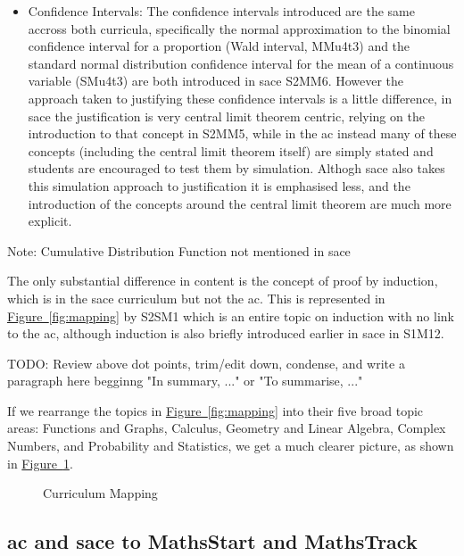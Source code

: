\documentclass[twoside,12pt,a4paper]{report}
\newcommand{\reffig}[1]{\hyperref[fig:#1]{Figure~\ref{fig:#1}}}
\begin{document}
\begin{itemize}
\begin{itemize}
			\item Confidence Intervals: The confidence intervals introduced are the same accross both curricula, specifically the normal approximation to the binomial confidence interval for a proportion (Wald interval, MMu4t3) and the standard normal distribution confidence interval for the mean of a continuous variable (SMu4t3) are both introduced in \gls{sace} S2MM6. However the approach taken to justifying these confidence intervals is a little difference, in \gls{sace} the justification is very central limit theorem centric, relying on the introduction to that concept in S2MM5, while in the \gls{ac} instead many of these concepts (including the central limit theorem itself) are simply stated and students are encouraged to test them by simulation. Althogh \gls{sace} also takes this simulation approach to justification it is emphasised less, and the introduction of the concepts around the central limit theorem are much more explicit.
		\end{itemize}
\end{itemize}

Note: Cumulative Distribution Function not mentioned in \gls{sace}

The only substantial difference in content is the concept of proof by induction, which is in the \gls{sace} curriculum but not the \gls{ac}. This is represented in \reffig{mapping} by S2SM1 which is an entire topic on induction with no link to the \gls{ac}, although induction is also briefly introduced earlier in \gls{sace} in S1M12.


TODO: Review above dot points, trim/edit down, condense, and write a paragraph here begginng "In summary, ..." or "To summarise, ..." 


If we rearrange the topics in \reffig{mapping} into their five broad topic areas: Functions and Graphs, Calculus, Geometry and Linear Algebra, Complex Numbers, and Probability and Statistics, we get a much clearer picture, as shown in \reffig{mappingByTopic}.

\begin{figure}[p]
\begin{center}

\caption{Curriculum Mapping\label{fig:mappingByTopic}}
\end{center}
\end{figure}



\subsection{\gls{ac} and \gls{sace} to MathsStart and MathsTrack}
\end{document}
